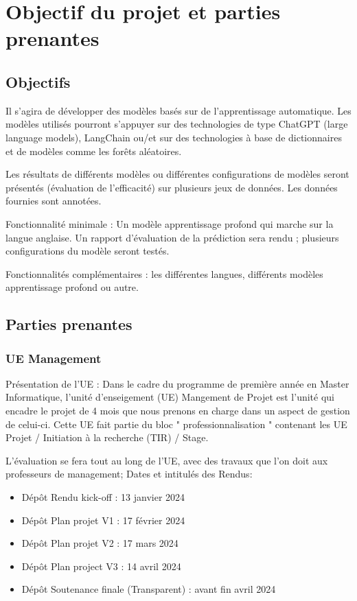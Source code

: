 \documentclass[11pt]{rapport_class}
\begin{document}
\chapter{Objectif du projet et parties prenantes}
\section{Objectifs}
Il s'agira de développer des modèles basés sur de l'apprentissage automatique. Les modèles utilisés pourront s’appuyer sur des technologies de type ChatGPT (large language models), LangChain ou/et sur des technologies à base de dictionnaires et de modèles comme les forêts aléatoires.

Les résultats de différents modèles ou différentes configurations de modèles seront présentés
(évaluation de l’efficacité) sur plusieurs jeux de données. Les données fournies sont annotées.

Fonctionnalité minimale : Un modèle apprentissage profond qui marche sur la langue anglaise. Un rapport d’évaluation de la prédiction sera rendu ; plusieurs configurations du modèle seront testés.

Fonctionnalités complémentaires : les différentes langues, différents modèles apprentissage profond ou autre.

\section{Parties prenantes}
\subsection{UE Management}
Présentation de l'UE : Dans le cadre du programme de première année en Master Informatique, l'unité d'enseigement (UE) Mangement de Projet est l'unité qui encadre le projet de 4 mois que nous prenons en charge dans un aspect de gestion de celui-ci. Cette UE fait partie du bloc " professionnalisation " contenant les UE Projet / Initiation à la recherche (TIR) / Stage.

L'évaluation se fera tout au long de l'UE, avec des travaux que l'on doit aux professeurs de management;
Dates et intitulés des Rendus:
\begin{itemize}
    \item Dépôt Rendu kick-off  : 13 janvier 2024
    \item Dépôt Plan projet V1  : 17 février 2024
    \item Dépôt Plan projet V2  : 17 mars 2024
    \item Dépôt Plan project V3 : 14 avril 2024
    \item Dépôt Soutenance finale (Transparent) : avant fin avril 2024
\end{itemize}
\end{document}
